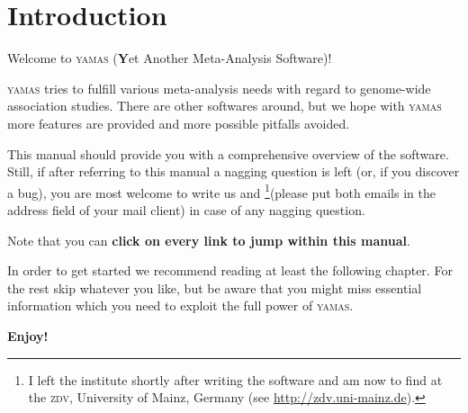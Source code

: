 \chapter{Introduction}

Welcome to \textsc{yamas} (\textcolor{pdarkblue}{\bf Y}et \textcolor{pdarkblue}{A}nother \textcolor{pdarkblue}{M}eta-\textcolor{pdarkblue}{A}nalysis \textcolor{pdarkblue}{S}oftware)!\newline

\textsc{yamas} tries to fulfill various meta-analysis needs with regard to genome-wide association studies. There are other softwares around, but we hope with \textsc{yamas} more features are provided and more possible pitfalls avoided.\newline

This manual should provide you with a comprehensive overview of the software. Still, if after referring to this manual a nagging question is left (or, if you discover a bug), you are most welcome to write us  and \footnote{I left the institute shortly after writing the software and am now to find at the \textsc{zdv}, University of Mainz, Germany (see \url{http://zdv.uni-mainz.de}).}(please put both emails in the address field of your mail client) in case of any nagging question.\newline

Note that you can \textcolor{pdarkblue}{\bf click on every link to jump within this manual}.\newline

In order to get started we recommend reading at least the following chapter. For the rest skip whatever you like, but be aware that you might miss essential information which you need to exploit the full power of \textsc{yamas}.\newline

\textbf{\Huge Enjoy!}






